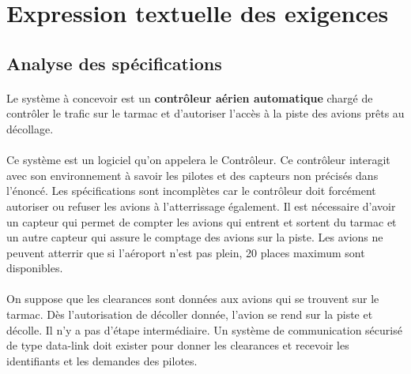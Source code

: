 \section{Expression textuelle des exigences}






\subsection{Analyse des spécifications}

\paragraph{}

Le système à concevoir est un \textbf{contrôleur aérien automatique} chargé de contrôler le trafic sur le tarmac et d'autoriser l'accès à la piste des avions prêts au décollage. 
\paragraph{}
Ce système est un logiciel qu'on appelera le Contrôleur. Ce contrôleur interagit avec son environnement à savoir les pilotes et des capteurs non précisés dans l'énoncé. Les spécifications sont incomplètes car le contrôleur doit forcément autoriser ou refuser les avions à l'atterrissage également. Il est nécessaire d'avoir un capteur qui permet de compter les avions qui entrent et sortent du tarmac et un autre capteur qui assure le comptage des avions sur la piste. Les avions ne peuvent atterrir que si l'aéroport n'est pas plein, 20 places maximum sont disponibles. 
\paragraph{}
On suppose que les clearances sont données aux avions qui se trouvent sur le tarmac. Dès l'autorisation de décoller donnée, l'avion se rend sur la piste et décolle. Il n'y a pas d'étape intermédiaire. Un système de communication sécurisé de type data-link doit exister pour donner les clearances et recevoir les identifiants et les demandes des pilotes.

